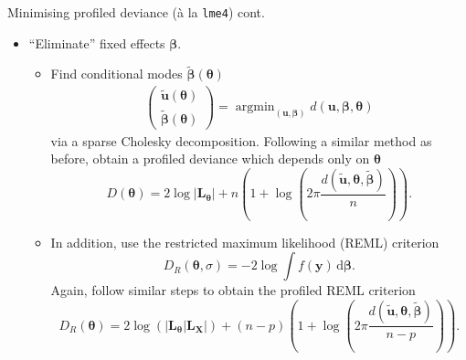 \documentclass{beamer}\usepackage[]{graphicx}\usepackage[]{color}
\begin{document}
\begin{frame}{Minimising profiled deviance (à la \texttt{lme4}) cont.}
	\vspace{-1mm}
	\begin{itemize}
		\item ``Eliminate'' fixed effects $\boldsymbol{\beta}$.
		\begin{itemize}
			\item Find conditional modes $\tilde{\boldsymbol{\beta}}(\boldsymbol\theta)$
			\begin{align*}
				\begin{pmatrix}
					\tilde{\mathbf u}(\boldsymbol\theta) \\
					\tilde{\boldsymbol{\beta}}(\boldsymbol\theta)
				\end{pmatrix}
				=
				\mathop{\arg\min}_{(\mathbf u, \boldsymbol{\beta})} d(\mathbf u, \boldsymbol\beta, \boldsymbol\theta)
			\end{align*}
			via a sparse Cholesky decomposition. Following a similar method as before, obtain a profiled deviance which depends only on $\boldsymbol{\theta}$
			\[
				D(\boldsymbol\theta) = 2 \log \vert \mathbf L_{\boldsymbol{\theta}} \vert + n \left( 1 + \log \left(2\pi \frac{d ( \tilde{\mathbf u}, \boldsymbol\theta, \tilde{\boldsymbol\beta})}{n} \right)\right).
			\]

			\pause
			\item In addition, use the restricted maximum likelihood (REML) criterion
			\[
				D_R(\boldsymbol\theta, \sigma) = -2 \log \int f(\mathbf y) \,\text{d} \boldsymbol\beta.
			\]
			Again, follow similar steps to obtain the profiled REML criterion
			\[
				D_R(\boldsymbol\theta) = 2 \log (\vert \mathbf L_{\boldsymbol{\theta}} \vert \mathbf L_{\mathbf X} \vert ) + (n - p) \left( 1 + \log \left(2\pi \frac{d ( \tilde{\mathbf u}, \boldsymbol\theta, \tilde{\boldsymbol\beta})}{n-p} \right)\right).
			\]
		\end{itemize}
	\end{itemize}
\end{frame}
\end{document}
